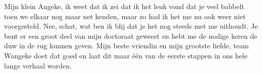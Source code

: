 \noindent Mijn klein Angeke, ik weet dat ik zei dat ik het leuk vond dat je veel babbelt toen we elkaar nog maar net kenden, maar zo had ik het me nu ook weer niet voorgesteld. Nee, schat, wat ben ik blij dat je het nog steeds met me uithoudt. Je bent er een groot deel van mijn doctoraat geweest en hebt me de nodige keren de duw in de rug kunnen geven. Mijn beste vriendin en mijn grootste liefde, team Wangeke doet dat goed en laat dit maar \'e\'en van de eerste stappen in ons hele lange verhaal worden.

~\vfill

\newpage
